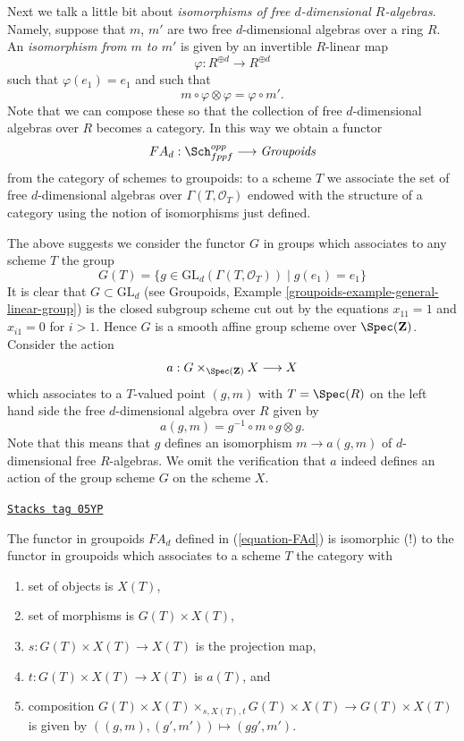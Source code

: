\medskip\noindent
Next we talk a little bit about {\it isomorphisms of free $d$-dimensional
$R$-algebras}. Namely, suppose that $m$, $m'$ are two free $d$-dimensional
algebras over a ring $R$. An {\it isomorphism from $m$ to $m'$} is given by
an invertible $R$-linear map
$$
\varphi : R^{\oplus d} \longrightarrow R^{\oplus d}
$$
such that $\varphi(e_1) = e_1$ and such that
$$
m \circ \varphi \otimes \varphi = \varphi \circ m'.
$$
Note that we can compose these so that the collection of
free $d$-dimensional algebras over $R$ becomes a category.
In this way we obtain a functor
\begin{equation}
\label{equation-FAd}
FA_d : \Sch_{fppf}^{opp} \longrightarrow \textit{Groupoids}
\end{equation}
from the category of schemes to groupoids: to a scheme $T$ we associate the
set of free $d$-dimensional algebras over $\Gamma(T, \mathcal{O}_T)$
endowed with the structure
of a category using the notion of isomorphisms just defined.

\medskip\noindent
The above suggests we consider the functor $G$ in groups
which associates to any scheme $T$ the group
$$
G(T) = \{g \in \text{GL}_d(\Gamma(T, \mathcal{O}_T)) \mid g(e_1) = e_1\}
$$
It is clear that $G \subset \text{GL}_d$ (see
Groupoids, Example \ref{groupoids-example-general-linear-group})
is the closed subgroup scheme cut out by the equations
$x_{11} = 1$ and $x_{i1} = 0$ for $i > 1$. Hence $G$ is a smooth
affine group scheme over $\Spec(\mathbf{Z})$. Consider the
action
$$
a : G \times_{\Spec(\mathbf{Z})} X \longrightarrow X
$$
which associates to a $T$-valued point $(g, m)$ with $T = \Spec(R)$
on the left hand side the free $d$-dimensional algebra over $R$
given by
$$
a(g, m) = g^{-1} \circ m \circ g \otimes g.
$$
Note that this means that $g$ defines an isomorphism $m \to a(g, m)$
of $d$-dimensional free $R$-algebras. We omit the verification that
$a$ indeed defines an action of the group scheme $G$ on the scheme $X$.

\begin{lemma}
\label{criteria-lemma-represent-FAd}
\href{https://stacks.math.columbia.edu/tag/05YP}{\texttt{Stacks tag 05YP}}

The functor in groupoids $FA_d$ defined in (\ref{equation-FAd})
is isomorphic (!) to the functor in groupoids which associates
to a scheme $T$ the category with
\begin{enumerate}
\item set of objects is $X(T)$,
\item set of morphisms is $G(T) \times X(T)$,
\item $s : G(T) \times X(T) \to X(T)$ is the projection map,
\item $t : G(T) \times X(T) \to X(T)$ is $a(T)$, and
\item composition $G(T) \times X(T) \times_{s, X(T), t} G(T) \times X(T)
\to G(T) \times X(T)$ is given by $((g, m), (g', m')) \mapsto (gg', m')$.
\end{enumerate}
\end{lemma}

